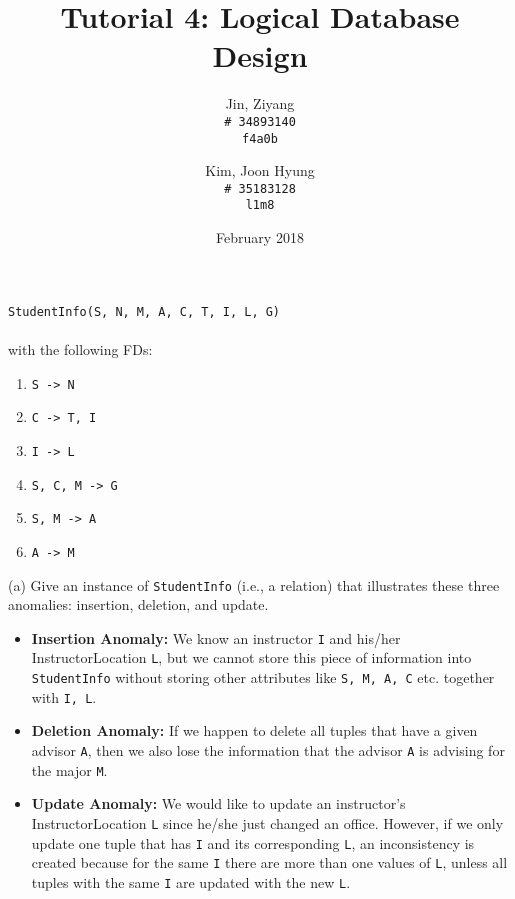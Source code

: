 \documentclass{article}
\title{Tutorial 4: Logical Database Design}
\author{
	Jin, Ziyang\\
	\texttt{\# 34893140}\\
	\texttt{f4a0b}
	\and
	Kim, Joon Hyung\\
	\texttt{\# 35183128}\\
	\texttt{l1m8}
}
\date{February 2018}
\begin{document}
	\maketitle
	\texttt{StudentInfo(S, N, M, A, C, T, I, L, G)}\\
	\\
	with the following FDs:
	\begin{enumerate}
		\item \texttt{S -> N}
		\item \texttt{C -> T, I}
		\item \texttt{I -> L}
		\item \texttt{S, C, M -> G}
		\item \texttt{S, M -> A}
		\item \texttt{A -> M}
	\end{enumerate}
	
\noindent (a) Give an instance of \texttt{StudentInfo} (i.e., a relation) that illustrates these three anomalies: insertion, deletion, and update.\\
\begin{itemize}
	\item \textbf{Insertion Anomaly:} We know an instructor \texttt{I} and his/her InstructorLocation \texttt{L}, but we cannot store this piece of information into \texttt{StudentInfo} without storing other attributes like \texttt{S, M, A, C} etc. together with \texttt{I, L}.
	
	\item \textbf{Deletion Anomaly:} If we happen to delete all tuples that have a given advisor \texttt{A}, then we also lose the information that the advisor \texttt{A} is advising for the major \texttt{M}.
	
	\item \textbf{Update Anomaly:} We would like to update an instructor's InstructorLocation \texttt{L} since he/she just changed an office. However, if we only update one tuple that has \texttt{I} and its corresponding \texttt{L}, an inconsistency is created because for the same \texttt{I} there are more than one values of \texttt{L}, unless all tuples with the same \texttt{I} are updated with the new \texttt{L}.
\end{itemize}
\end{document}
